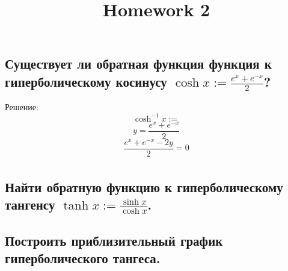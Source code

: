 \documentclass[a4paper, fontsize=10pt]{article}
\title{Homework 2}
\date{}
\begin{document}
\maketitle

\section{}
\subsection{\normalsize \normalfont Существует ли обратная функция функция к гиперболическому косинусу $\cosh{x} := \frac{e^x + e^{-x}}{2}$?}

\indent Решение:
$$\cosh^{-1}{x} :=$$
$$y = \frac{e^x + e^{-x}}{2}$$
$$ \frac{e^x + e^{-x} - 2y}{2} = 0 $$
\begin{align*}
\end{align*}


\subsection{\normalsize \normalfont Найти обратную функцию к гиперболическому тангенсу $\tanh{x} := \frac{\sinh{x}}{\cosh{x}}$.}
\subsection{\normalsize \normalfont Построить приблизительный график гиперболического тангеса.}
\end{document}
